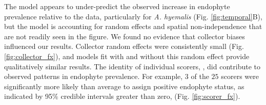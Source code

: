 \documentclass[11pt]{article}
\newcommand{\firstrevise}[1]{{\color{black}{#1}}}
\begin{document}
The model appears to under-predict the observed increase in endophyte prevalence relative to the data, particularly for \emph{A. hyemalis} (Fig. \ref{fig:temporal}B), but the model is accounting for random effects and spatial non-independence that are not readily seen in the figure. 
We found no evidence that collector biases influenced our results. 
Collector random effects were consistently small (Fig. \ref{fig:collector_fx}), and models fit with and without this random effect provide qualitatively similar results.
The identity of individual scorers, \firstrevise{the researchers who identified endophyte status microscopically}, did contribute to observed patterns in endophyte prevalence.
For example, $3$ of the $25$ scorers were significantly more likely than average to assign positive endophyte status, as indicated by 95\% credible intervals greater than zero, \firstrevise{while $4$ of the $25$ had 95\% credible intervals below zero} (Fig. \ref{fig:scorer_fx}). 
\end{document}
